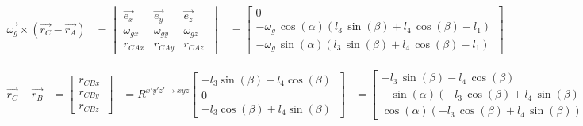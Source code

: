 \begin{equation*}
\begin{split}
\overrightarrow{\omega_{g}}\times(\overrightarrow{r_{C}}-\overrightarrow{r_{A}})
&=	\begin{vmatrix}
	\overrightarrow{e_{x}} & \overrightarrow{e_{y}} & \overrightarrow{e_{z}}\\
	\omega_{gx} & \omega_{gy} & \omega_{gz}\\
	r_{CAx} & r_{CAy} & r_{CAz}\
	\end{vmatrix}
&=	\begin{bmatrix}
	0\\
	-\omega_{g}\,\cos\left( \alpha \right)  \left( l_{3}\,\sin \left( \beta \right) +l_{4}\,\cos \left( \beta \right) -l_{1} \right)\\
	-\omega_{g}\,\sin \left( \alpha \right)  \left( l_{3}\,\sin \left( \beta \right) +l_{4}\,\cos \left( \beta \right) -l_{1} \right)\
\end{bmatrix}
\end{split}
\end{equation*}

\begin{equation*}
\begin{split}
\overrightarrow{r_{C}}-\overrightarrow{r_{B}}
&=	\begin{bmatrix}
	r_{CBx}\\
	r_{CBy}\\
	r_{CBz}\
	\end{bmatrix}
&=	R^{x'y'z' \rightarrow xyz}
	\begin{bmatrix}
	-l_{3}\sin(\beta)-l_{4}\cos(\beta)\\
	0\\
	-l_{3}\cos(\beta)+l_{4}\sin(\beta)\
	\end{bmatrix}
&=	\begin{bmatrix}
-l_{3}\,\sin \left( \beta \right) -l_{4}\,\cos \left( \beta \right) \\
-\sin \left( \alpha\right)  \left( -l_{3}\,\cos \left( \beta \right) +l_{4}\,\sin\left( \beta \right)  \right) \\
\cos \left( \alpha\right)  \left( -l_{3}\,\cos \left( \beta \right) +l_{4}\,\sin\left( \beta \right)  \right)\
\end{bmatrix}
\end{split}
\end{equation*}

